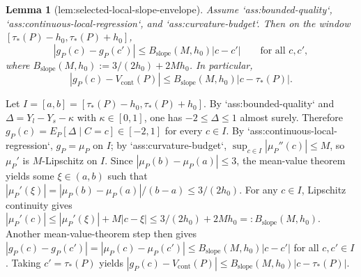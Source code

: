 \documentclass{article}
\newtheorem{lemma}{Lemma}
\begin{document}
\begin{lemma}[lem:selected-local-slope-envelope]\label{lem:selected-local-slope-envelope}
Assume `ass:bounded-quality`, `ass:continuous-local-regression`, and `ass:curvature-budget`. Then on the window \([\tau_*(P)-h_0,\tau_*(P)+h_0]\),
\[
|g_P(c)-g_P(c')|\le B_{\mathrm{slope}}(M,h_0)|c-c'|\qquad\text{for all }c,c',
\]
where \(B_{\mathrm{slope}}(M,h_0):=3/(2h_0)+2Mh_0\). In particular,
\[
|g_P(c)-V_{\mathrm{cont}}(P)|\le B_{\mathrm{slope}}(M,h_0)|c-\tau_*(P)|.
\]
\end{lemma}
Let \(I=[a,b]=[\tau_*(P)-h_0,\tau_*(P)+h_0]\). By `ass:bounded-quality` and \(\Delta=Y_l-Y_s-\kappa\) with \(\kappa\in[0,1]\), one has \(-2\le \Delta\le 1\) almost surely. Therefore \(g_P(c)=E_P[\Delta\mid C=c]\in[-2,1]\) for every \(c\in I\). By `ass:continuous-local-regression`, \(g_P=\mu_P\) on \(I\); by `ass:curvature-budget`, \(\sup_{c\in I}|\mu_P''(c)|\le M\), so \(\mu_P'\) is \(M\)-Lipschitz on \(I\). Since \(|\mu_P(b)-\mu_P(a)|\le 3\), the mean-value theorem yields some \(\xi\in(a,b)\) such that \(|\mu_P'(\xi)|=|\mu_P(b)-\mu_P(a)|/(b-a)\le 3/(2h_0)\). For any \(c\in I\), Lipschitz continuity gives \(|\mu_P'(c)|\le |\mu_P'(\xi)|+M|c-\xi|\le 3/(2h_0)+2Mh_0=:B_{\mathrm{slope}}(M,h_0)\). Another mean-value-theorem step then gives \(|g_P(c)-g_P(c')|=|\mu_P(c)-\mu_P(c')|\le B_{\mathrm{slope}}(M,h_0)|c-c'|\) for all \(c,c'\in I\). Taking \(c'=\tau_*(P)\) yields \(|g_P(c)-V_{\mathrm{cont}}(P)|\le B_{\mathrm{slope}}(M,h_0)|c-\tau_*(P)|\).
\end{document}
